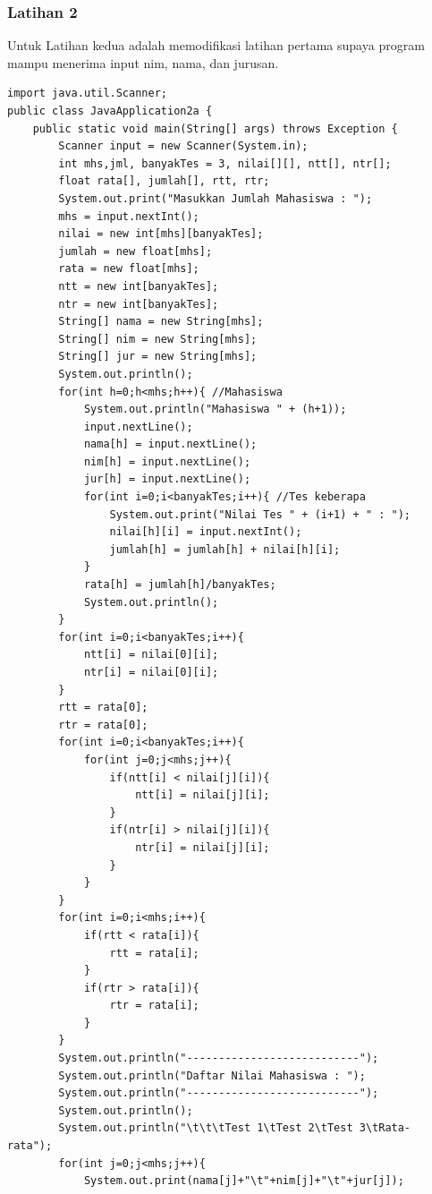 \documentclass[a4paper,12pt]{article}
\begin{document}
\subsubsection{Latihan 2}
Untuk Latihan kedua adalah memodifikasi latihan pertama supaya program mampu menerima input nim, nama, dan jurusan. 
\begin{lstlisting}
import java.util.Scanner;
public class JavaApplication2a {
    public static void main(String[] args) throws Exception {
        Scanner input = new Scanner(System.in);
        int mhs,jml, banyakTes = 3, nilai[][], ntt[], ntr[];
        float rata[], jumlah[], rtt, rtr;
        System.out.print("Masukkan Jumlah Mahasiswa : ");
        mhs = input.nextInt();
        nilai = new int[mhs][banyakTes];
        jumlah = new float[mhs];
        rata = new float[mhs];
        ntt = new int[banyakTes];
        ntr = new int[banyakTes];
        String[] nama = new String[mhs];
        String[] nim = new String[mhs];
        String[] jur = new String[mhs];
        System.out.println();
        for(int h=0;h<mhs;h++){ //Mahasiswa
            System.out.println("Mahasiswa " + (h+1));
            input.nextLine();
            nama[h] = input.nextLine();
            nim[h] = input.nextLine();
            jur[h] = input.nextLine();
            for(int i=0;i<banyakTes;i++){ //Tes keberapa
                System.out.print("Nilai Tes " + (i+1) + " : ");
                nilai[h][i] = input.nextInt();
                jumlah[h] = jumlah[h] + nilai[h][i];
            }
            rata[h] = jumlah[h]/banyakTes;
            System.out.println();
        }
        for(int i=0;i<banyakTes;i++){
            ntt[i] = nilai[0][i];
            ntr[i] = nilai[0][i];
        }
        rtt = rata[0];
        rtr = rata[0];
        for(int i=0;i<banyakTes;i++){
            for(int j=0;j<mhs;j++){
                if(ntt[i] < nilai[j][i]){
                    ntt[i] = nilai[j][i];
                }
                if(ntr[i] > nilai[j][i]){
                    ntr[i] = nilai[j][i];
                }
            }
        }
        for(int i=0;i<mhs;i++){
            if(rtt < rata[i]){
                rtt = rata[i];
            }
            if(rtr > rata[i]){
                rtr = rata[i];
            }
        }
        System.out.println("---------------------------");
        System.out.println("Daftar Nilai Mahasiswa : ");
        System.out.println("---------------------------");
        System.out.println();
        System.out.println("\t\t\tTest 1\tTest 2\tTest 3\tRata- rata");
        for(int j=0;j<mhs;j++){
            System.out.print(nama[j]+"\t"+nim[j]+"\t"+jur[j]);

\end{lstlisting}
\end{document}
